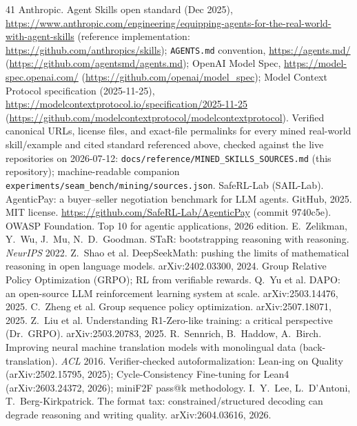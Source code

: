 \documentclass{article}
\begin{document}
\begin{thebibliography}{41}
 Anthropic. Agent Skills open standard (Dec 2025), \url{https://www.anthropic.com/engineering/equipping-agents-for-the-real-world-with-agent-skills} (reference implementation: \url{https://github.com/anthropics/skills}); \texttt{AGENTS.md} convention, \url{https://agents.md/} (\url{https://github.com/agentsmd/agents.md}); OpenAI Model Spec, \url{https://model-spec.openai.com/} (\url{https://github.com/openai/model_spec}); Model Context Protocol specification (2025-11-25), \url{https://modelcontextprotocol.io/specification/2025-11-25} (\url{https://github.com/modelcontextprotocol/modelcontextprotocol}).
 Verified canonical URLs, license files, and exact-file permalinks for every mined real-world skill/example and cited standard referenced above, checked against the live repositories on 2026-07-12: \texttt{docs/reference/MINED\_SKILLS\_SOURCES.md} (this repository); machine-readable companion \texttt{experiments/seam\_bench/mining/sources.json}.
 SafeRL-Lab (SAIL-Lab). AgenticPay: a buyer--seller negotiation benchmark for LLM agents. GitHub, 2025. MIT license. \url{https://github.com/SafeRL-Lab/AgenticPay} (commit 9740c5e).
 OWASP Foundation. Top 10 for agentic applications, 2026 edition.
 E.~Zelikman, Y.~Wu, J.~Mu, N.~D.~Goodman. STaR: bootstrapping reasoning with reasoning. \emph{NeurIPS} 2022.
 Z.~Shao et al. DeepSeekMath: pushing the limits of mathematical reasoning in open language models. arXiv:2402.03300, 2024. Group Relative Policy Optimization (GRPO); RL from verifiable rewards.
 Q.~Yu et al. DAPO: an open-source LLM reinforcement learning system at scale. arXiv:2503.14476, 2025.
 C.~Zheng et al. Group sequence policy optimization. arXiv:2507.18071, 2025.
 Z.~Liu et al. Understanding R1-Zero-like training: a critical perspective (Dr.\ GRPO). arXiv:2503.20783, 2025.
 R.~Sennrich, B.~Haddow, A.~Birch. Improving neural machine translation models with monolingual data (back-translation). \emph{ACL} 2016.
 Verifier-checked autoformalization: Lean-ing on Quality (arXiv:2502.15795, 2025); Cycle-Consistency Fine-tuning for Lean4 (arXiv:2603.24372, 2026); miniF2F pass@k methodology.
 I.~Y.~Lee, L.~D'Antoni, T.~Berg-Kirkpatrick. The format tax: constrained/structured decoding can degrade reasoning and writing quality. arXiv:2604.03616, 2026.

\end{thebibliography}
\end{document}
